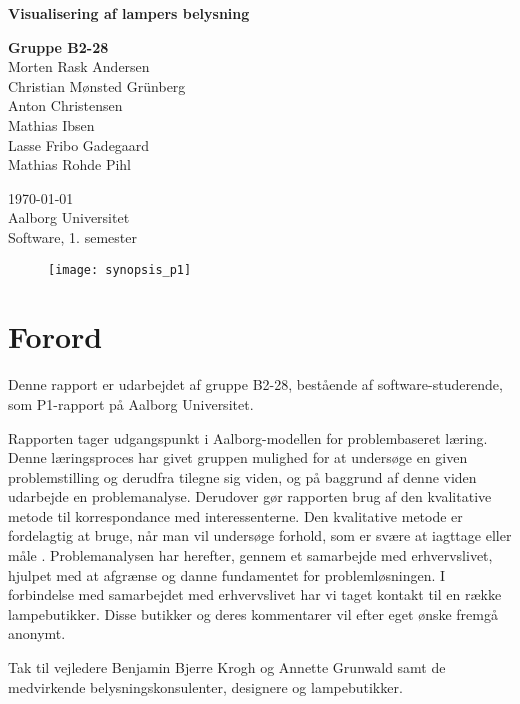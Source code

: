 \begin{titlepage}
  \vspace{0.2cm}
  \begin{center}
    \Huge{\textbf{Visualisering af lampers belysning}}
  \end{center}
  \vspace{0.2cm}
  \begin{center}
    \Large{\textbf{Gruppe B2-28}}\\
	Morten Rask Andersen\\
	Christian Mønsted Grünberg\\
	Anton Christensen\\
	Mathias Ibsen\\
	Lasse Fribo Gadegaard\\
	Mathias Rohde Pihl
  \end{center}
  \vfill
  \begin{center}
 	\today\\
    Aalborg Universitet\\
    Software, 1. semester
  \end{center}
\end{titlepage}

\begin{figure}[H]
    \texttt{[image: synopsis\_p1]}
\end{figure}
\clearpage



\clearpage


\section{Forord}
Denne rapport er udarbejdet af gruppe B2-28, bestående af software-studerende, som P1-rapport på Aalborg Universitet.

Rapporten tager udgangspunkt i Aalborg-modellen for problembaseret læring. Denne læringsproces har givet gruppen mulighed for at undersøge en given problemstilling og derudfra tilegne sig viden, og på baggrund af denne viden udarbejde en problemanalyse. Derudover gør rapporten brug af den kvalitative metode til korrespondance med interessenterne. Den kvalitative metode er fordelagtig at bruge, når man vil undersøge forhold, som er svære at iagttage eller måle \cite{kvalitativ_metode}. Problemanalysen har herefter, gennem et samarbejde med erhvervslivet, hjulpet med at afgrænse og danne fundamentet for problemløsningen. I forbindelse med samarbejdet med erhvervslivet har vi taget kontakt til en række lampebutikker. Disse butikker og deres kommentarer vil efter eget ønske fremgå anonymt. 

Tak til vejledere Benjamin Bjerre Krogh og Annette Grunwald samt de medvirkende belysningskonsulenter, designere og lampebutikker.
\clearpage

\clearpage
